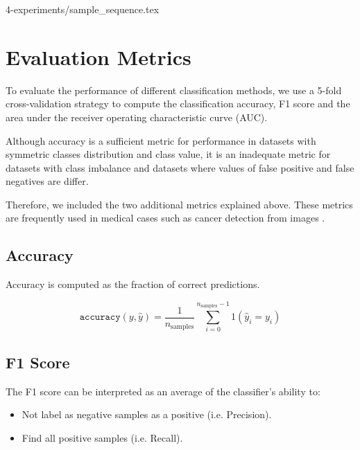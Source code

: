 
{4-experiments/sample_sequence.tex}


\section{Evaluation Metrics}

To evaluate the performance of different classification methods, we use a 5-fold cross-validation strategy to compute the classification accuracy, F1 score and the area under the receiver operating characteristic curve (AUC). 

Although accuracy is a sufficient metric for performance in datasets with symmetric classes distribution and class value, it is an inadequate metric for datasets with class imbalance and datasets where values of false positive and false negatives are differ. 

Therefore, we included the two additional metrics explained above. These metrics are frequently used in medical cases such as cancer detection from images \cite{Sirinukunwattana2016LocalityImages}\cite{Ciresan2013MitosisNetworks}.

\subsection{Accuracy}
Accuracy is computed as the fraction of correct predictions.

\[ \texttt{accuracy}(y, \hat{y}) = \frac{1}{n_\text{samples}} \sum_{i=0}^{n_\text{samples}-1} 1(\hat{y}_i = y_i) \]

\subsection{F1 Score}
The F1 score can be interpreted as an average of the classifier’s ability to:
\begin{itemize}
    \item Not label as negative samples as a positive (i.e. Precision).
    \item Find all positive samples (i.e. Recall).
\end{itemize}

